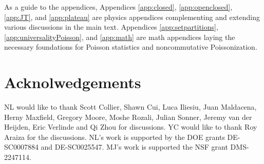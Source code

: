 \documentclass[a4paper,11pt]{article}
\theoremstyle{definition}
\numberwithin{equation}{section}
\begin{document}
As a guide to the appendices, Appendices \ref{app:closed}, \ref{app:openclosed}, \ref{app:JT}, and \ref{app:plateau} are physics appendices complementing and extending various discussions in the main text. Appendices \ref{app:setpartitions}, \ref{app:universalityPoisson}, and \ref{app:math} are math appendices laying the necessary foundations for Poisson statistics and noncommutative Poissonization.
    
\section*{Acknolwedgements}

NL would like to thank Scott Collier, Shawn Cui, Luca Iliesiu, Juan Maldacena, Herny Maxfield, Gregory Moore, Moshe Rozali, Julian Sonner, Jeremy van der Heijden, Eric Verlinde and Qi Zhou for discussions. YC would like to thank Roy Araiza for the discussions. NL's work is supported by the DOE grants DE-SC0007884 and DE-SC0025547. MJ's work is supported the NSF grant DMS-2247114.

\appendix
\end{document}

